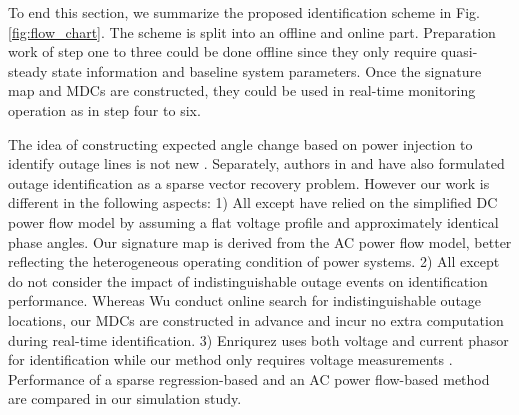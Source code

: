 To end this section, we summarize the proposed identification scheme in Fig. \ref{fig:flow_chart}. The scheme is split into an offline and online part. Preparation work of step one to three could be done offline since they only require quasi-steady state information and baseline system parameters. Once the signature map and MDCs are constructed, they could be used in real-time monitoring operation as in step four to six.

The idea of constructing expected angle change based on power injection to identify outage lines is not new \cite{Tate2008,Wu2015,Costilla-Enriquez2019}. Separately, authors in \cite{Zhu2012} and \cite{Chen2014} have also formulated outage identification as a sparse vector recovery problem. However our work is different in the following aspects: 1) All except \cite{Costilla-Enriquez2019} have relied on the simplified DC power flow model by assuming a flat voltage profile and approximately identical phase angles. Our signature map is derived from the AC power flow model, better reflecting the heterogeneous operating condition of power systems. 2) All except \cite{Wu2015} do not consider the impact of indistinguishable outage events on identification performance. Whereas Wu \etal conduct online search for indistinguishable outage locations, our MDCs are constructed in advance and incur no extra computation during real-time identification. 3) Enriqurez \etal uses both voltage and current phasor for identification while our method only requires voltage measurements \cite{Costilla-Enriquez2019}. Performance of a sparse regression-based \cite{Zhu2012} and an AC power flow-based method \cite{Costilla-Enriquez2019} are compared in our simulation study.



